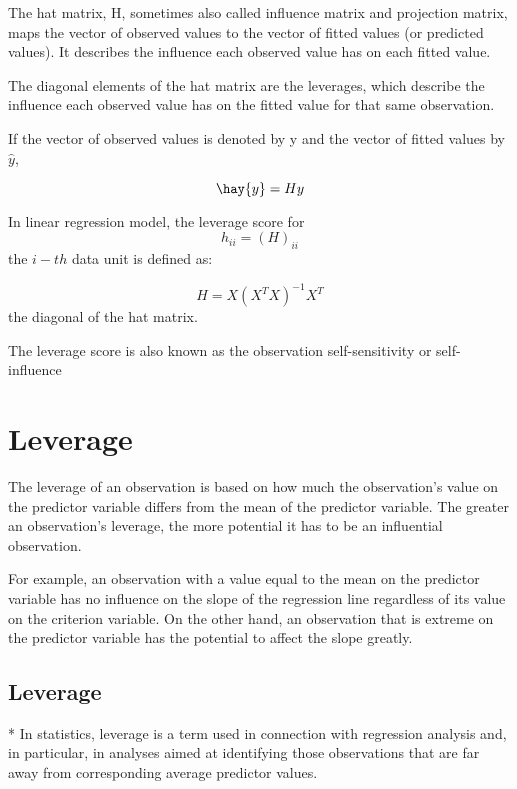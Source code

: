 


The hat matrix, H, sometimes also called influence matrix and projection matrix, maps the vector of observed values to the vector of 
fitted values (or predicted values). It describes the influence each observed value has on each fitted value.

The diagonal elements of the hat matrix are the leverages, which describe the influence each observed value has on the fitted value for that same observation.
 
If the vector of observed values is denoted by y and the vector of fitted values by $\hat{y}$,
 
\[ \hay{y} = H y\]



In linear regression model, the leverage score for \[ h_{ii} = (H)_{ii}\] the $i-th$ data unit is defined as:

 
\[ H = X(X^{T} X)^{-1}X^{T} \]
the diagonal of the hat matrix.


The leverage score is also known as the observation self-sensitivity or self-influence

\newpage

\section{Leverage}
The leverage of an observation is based on how much the observation's value on the predictor variable differs from the 
mean of the predictor variable. The greater an observation's leverage, the more potential it has to be an influential observation. 

For example, an observation with a value equal to the mean on the predictor variable has no influence on the slope of the regression line regardless of its value on the criterion variable. On the other hand, an observation that is extreme on the predictor variable has the potential to affect the slope greatly.



\subsection{Leverage}

* In statistics, leverage is a term used in connection with regression analysis and, in particular, in analyses aimed at identifying those observations that are far away from corresponding average predictor values.

